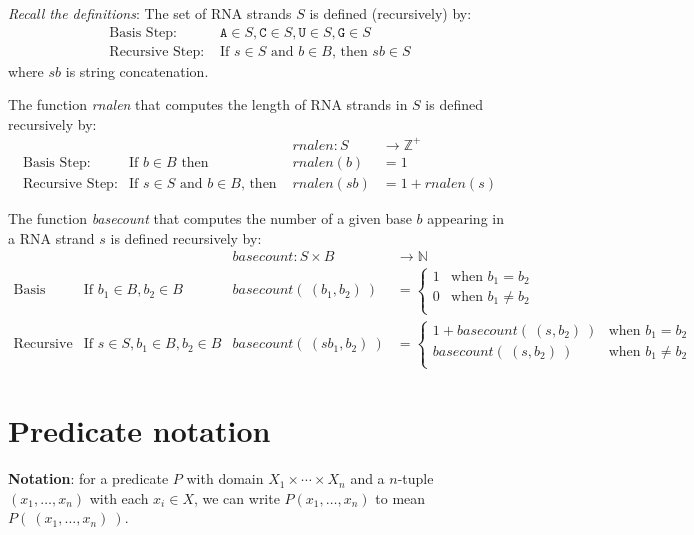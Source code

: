 \documentclass[12pt, oneside]{article}
\newcommand{\A}[0]{\texttt{A}}
\newcommand{\C}[0]{\texttt{C}}
\newcommand{\G}[0]{\texttt{G}}
\newcommand{\U}[0]{\texttt{U}}
\begin{document}
{\it Recall the definitions}: The set of RNA strands $S$ is defined (recursively) by:
\[
\begin{array}{ll}
\textrm{Basis Step: } & \A \in S, \C \in S, \U \in S, \G \in S \\
\textrm{Recursive Step: } & \textrm{If } s \in S\textrm{ and }b \in B \textrm{, then }sb \in S
\end{array}
\]
where $sb$ is string concatenation.

The function \textit{rnalen} that computes the length of RNA strands in $S$ is defined recursively by:
\[
\begin{array}{llll}
& & \textit{rnalen} : S & \to \mathbb{Z}^+ \\
\textrm{Basis Step:} & \textrm{If } b \in B\textrm{ then } & \textit{rnalen}(b) & = 1 \\
\textrm{Recursive Step:} & \textrm{If } s \in S\textrm{ and }b \in B\textrm{, then  } & \textit{rnalen}(sb) & = 1 + \textit{rnalen}(s)
\end{array}
\]

The function \textit{basecount} that computes the number of a given base 
$b$ appearing in a RNA strand $s$ is defined recursively by:
\[
\begin{array}{llll}
& & \textit{basecount} : S \times B & \to \mathbb{N} \\
\textrm{Basis Step:} &  \textrm{If } b_1 \in B, b_2 \in B & \textit{basecount}(~(b_1, b_2)~) & =
        \begin{cases}
            1 & \textrm{when } b_1 = b_2 \\
            0 & \textrm{when } b_1 \neq b_2 \\
        \end{cases} \\
\textrm{Recursive Step:} & \textrm{If } s \in S, b_1 \in B, b_2 \in B &\textit{basecount}(~(s b_1, b_2)~) & =
        \begin{cases}
            1 + \textit{basecount}(~(s, b_2)~) & \textrm{when } b_1 = b_2 \\
            \textit{basecount}(~(s, b_2)~) & \textrm{when } b_1 \neq b_2 \\
        \end{cases}
\end{array}
\] \vfill
\section*{Predicate notation}


{\bf Notation}: for a predicate $P$ with domain $X_1 \times \cdots \times X_n$ and a 
$n$-tuple $(x_1, \ldots, x_n)$ 
with each $x_i \in X$, we 
can write $P(x_1, \ldots, x_n)$ to mean $P( ~(x_1, \ldots, x_n)~)$.
 \vfill
\end{document}
